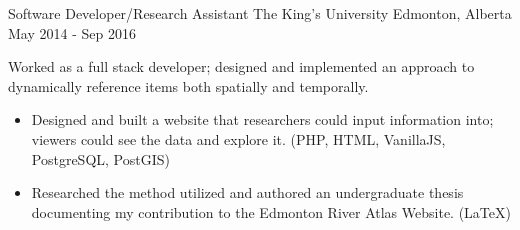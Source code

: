 \begin{cventries}
{\begin{itemize}
            \end{itemize}
        }
    \cventry
        {Software Developer/Research Assistant}
        {The King's University}
        {Edmonton, Alberta}
        {May 2014 - Sep 2016}
        {
            Worked as a full stack developer; designed and implemented an approach to dynamically reference items both spatially and temporally.
            \begin{itemize}
                \item Designed and built a website that researchers could input information into; viewers could see the data and explore it. (PHP, HTML, VanillaJS, PostgreSQL, PostGIS)
                \item Researched the method utilized and authored an undergraduate thesis documenting my contribution to the Edmonton River Atlas
                Website. (\LaTeX)
            \end{itemize}
        }

\end{cventries}
